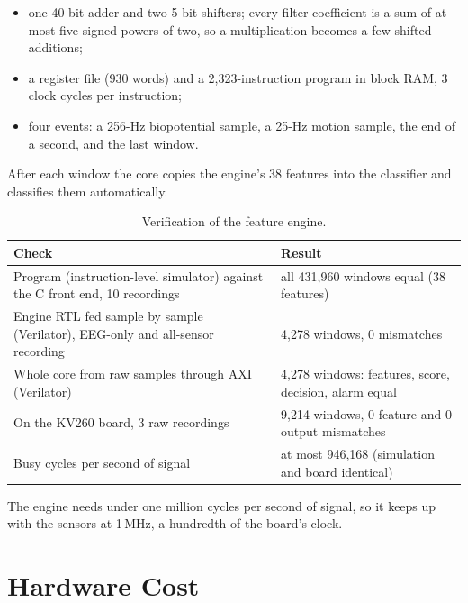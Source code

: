 \begin{itemize}
\item one 40-bit adder and two 5-bit shifters; every filter coefficient is a sum of at most five signed powers of
  two, so a multiplication becomes a few shifted additions;
\item a register file (930 words) and a 2,323-instruction program in block RAM, 3 clock cycles per instruction;
\item four events: a 256-Hz biopotential sample, a 25-Hz motion sample, the end of a second, and the last window.
\end{itemize}

After each window the core copies the engine's 38 features into the classifier and classifies them automatically.

\begin{table}[H]
\centering\small
\caption{Verification of the feature engine.}\label{tab:fe-verif}
\begin{tabularx}{\textwidth}{@{}LP{58mm}@{}}
\toprule
\textbf{Check} & \textbf{Result}\\
\midrule
Program (instruction-level simulator) against the C front end, 10 recordings & all 431,960 windows equal (38 features)\\
Engine RTL fed sample by sample (Verilator), EEG-only and all-sensor recording & 4,278 windows, 0 mismatches\\
Whole core from raw samples through AXI (Verilator) & 4,278 windows: features, score, decision, alarm equal\\
On the KV260 board, 3 raw recordings & 9,214 windows, 0 feature and 0 output mismatches\\
Busy cycles per second of signal & at most 946,168 (simulation and board identical)\\
\bottomrule
\end{tabularx}
\end{table}

The engine needs under one million cycles per second of signal, so it keeps up with the sensors at 1\,MHz, a
hundredth of the board's clock.

\section{Hardware Cost}

